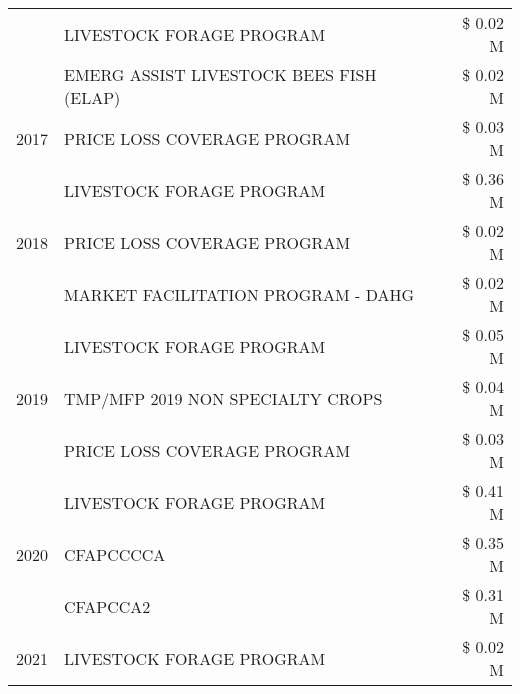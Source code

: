 \begin{tabular}{llr}
 & LIVESTOCK FORAGE PROGRAM                      & \$ 0.02 M \\
 & EMERG ASSIST LIVESTOCK BEES FISH (ELAP)       & \$ 0.02 M \\
\cline{1-3}
2017 & PRICE LOSS COVERAGE PROGRAM & \$ 0.03 M \\
\cline{1-3}
\multirow[t]{3}{*}{2018} & LIVESTOCK FORAGE PROGRAM & \$ 0.36 M \\
 & PRICE LOSS COVERAGE PROGRAM & \$ 0.02 M \\
 & MARKET FACILITATION PROGRAM - DAHG & \$ 0.02 M \\
\cline{1-3}
\multirow[t]{3}{*}{2019} & LIVESTOCK FORAGE PROGRAM & \$ 0.05 M \\
 & TMP/MFP 2019 NON SPECIALTY CROPS & \$ 0.04 M \\
 & PRICE LOSS COVERAGE PROGRAM & \$ 0.03 M \\
\cline{1-3}
\multirow[t]{3}{*}{2020} & LIVESTOCK FORAGE PROGRAM & \$ 0.41 M \\
 & CFAPCCCCA & \$ 0.35 M \\
 & CFAPCCA2 & \$ 0.31 M \\
\cline{1-3}
2021 & LIVESTOCK FORAGE PROGRAM & \$ 0.02 M \\
\cline{1-3}
\bottomrule
\end{tabular}
